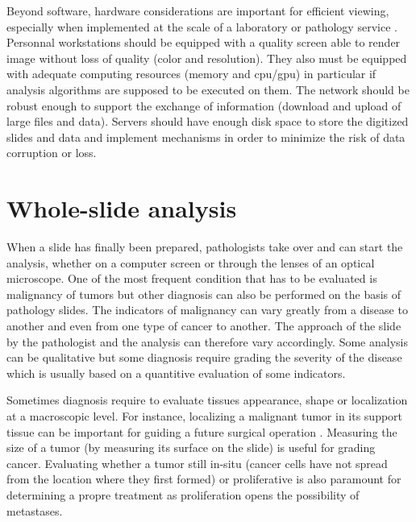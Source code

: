 Beyond software, hardware considerations are important for efficient viewing, especially when implemented at the scale of a laboratory or pathology service \parencite{temprana2022digipatics}. Personnal workstations should be equipped with a quality screen able to render image without loss of quality (color and resolution). They also must be equipped with adequate computing resources (memory and \acrshort{cpu}/\acrshort{gpu}) in particular if analysis algorithms are supposed to be executed on them. The network should be robust enough to support the exchange of information (\ie download and upload of large files and data). Servers should have enough disk space to store the digitized slides and data and implement mechanisms in order to minimize the risk of data corruption or loss. 


\section{Whole-slide analysis}
\label{sec:backdp:typicalanalysistasks}

When a slide has finally been prepared, pathologists take over and can start the analysis, whether on a computer screen or through the lenses of an optical microscope. One of the most frequent condition that has to be evaluated is malignancy of tumors but other diagnosis can also be performed on the basis of pathology slides. The indicators of malignancy can vary greatly from a disease to another and even from one type of cancer to another. The approach of the slide by the pathologist and the analysis can therefore vary accordingly. Some analysis can be qualitative but some diagnosis require grading the severity of the disease which is usually based on a quantitive evaluation of some indicators. 

Sometimes diagnosis require to evaluate tissues appearance, shape or localization at a macroscopic level. For instance, localizing a malignant tumor in its support tissue can be important for guiding a future surgical operation . Measuring the size of a tumor (by measuring its surface on the slide) is useful for grading cancer. Evaluating whether a tumor still in-situ (\ie cancer cells have not spread from the location where they first formed) or proliferative is also paramount for determining a propre treatment as proliferation opens the possibility of metastases.  

